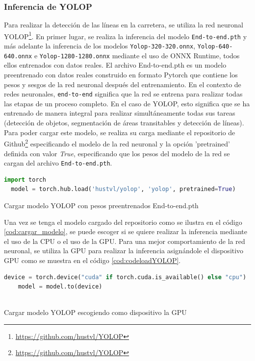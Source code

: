 \subsubsection{Inferencia de YOLOP}
\label{sec:Inferencia de YOLOP}

Para realizar la detección de las líneas en la carretera, se utiliza la red neuronal YOLOP\footnote{\url{https://github.com/hustvl/YOLOP}}. En primer lugar, 
se realiza la inferencia del modelo \texttt{End-to-end.pth} y más adelante la inferencia de los modelos \texttt{Yolop-320-320.onnx}, \texttt{Yolop-640-640.onnx} e 
\texttt{Yolop-1280-1280.onnx} mediante el uso de ONNX Runtime, todos ellos entrenados con datos reales. 
El archivo End-to-end.pth es un modelo preentrenado con datos reales construido en formato Pytorch que contiene los pesos y sesgos de la red neuronal después del entrenamiento. En el contexto de 
redes neuronales, \texttt{end-to-end} significa que la red se entrena para realizar todas las etapas de un proceso completo. En el caso de YOLOP, esto significa que se ha entrenado de manera integral 
para realizar simultáneamente todas sus tareas (detección de objetos, segmentación de áreas transitables y detección de líneas). Para poder cargar este modelo, se realiza 
su carga mediante el repositorio de Github\footnote{\url{https://github.com/hustvl/YOLOP}}
especificando el modelo de la red neuronal y la opción 'pretrained' definida con valor \textit{True}, especificando que los pesos del modelo de la red se cargan del archivo 
\texttt{End-to-end.pth}.

\begin{code}[h]
  \begin{lstlisting}[language=Python]
  import torch
  model = torch.hub.load('hustvl/yolop', 'yolop', pretrained=True)

  \end{lstlisting}
  \caption[Cargar modelo YOLOP con pesos preentrenados End-to-end.pth]{Cargar modelo YOLOP con pesos preentrenados End-to-end.pth}
  \label{cod:cargar_modelo}
  \end{code}  

Una vez se tenga el modelo cargado del repositorio como se ilustra en el código \ref{cod:cargar_modelo}, se puede escoger 
si se quiere realizar la inferencia mediante el uso de la CPU o el uso de la GPU. Para una mejor comportamiento de la red neuronal, se utiliza
la GPU para realizar la inferencia asignándole el dispositivo GPU como se muestra en el código \ref{cod:codeloadYOLOP}.

  
\begin{code}[h]
    \begin{lstlisting}[language=Python]
    device = torch.device("cuda" if torch.cuda.is_available() else "cpu")
    model = model.to(device)
  
    \end{lstlisting}
    \caption[Cargar modelo YOLOP escogiendo como dispositivo la GPU]{Cargar modelo YOLOP escogiendo como dispositivo la GPU}
    \label{cod:codeloadYOLOP}
    \end{code}  

